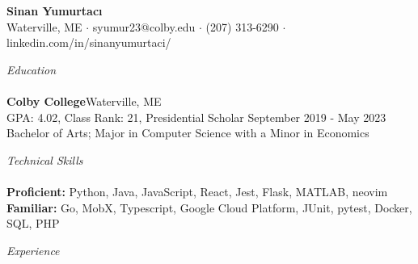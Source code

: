 \documentclass[letterpaper]{article}
\newcommand{\lineunder} {
    \vspace*{-8pt} \\
    \hspace*{-3pt} \hrulefill \\
}
\newcommand{\header} [1] {
	{\hspace*{-3pt}\vspace*{6pt} \textit{#1}}
    \vspace*{-6pt} \lineunder
}
\begin{document}
\vspace*{-40pt}


\vspace*{-10pt}
\begin{center}
	{\Large \textbf {Sinan Yumurtacı}}\\
	Waterville, ME $\cdot$ syumur23@colby.edu $\cdot$ (207) 313-6290 $\cdot$ linkedin.com/in/sinanyumurtaci/\\
\end{center}




\header{Education}
\textbf{Colby College}\hfill Waterville, ME\\
GPA: 4.02, Class Rank: 21, Presidential Scholar \hfill September 2019 - May 2023\\
Bachelor of Arts; Major in Computer Science with a Minor in Economics \\
\vspace{3mm}



\header{Technical Skills}
\vspace{1mm}
\textbf{Proficient:} Python, Java, JavaScript, React, Jest, Flask, MATLAB, neovim\\
\textbf{Familiar:} Go, MobX, Typescript, Google Cloud Platform, JUnit, pytest, Docker, SQL, PHP\\
\vspace{2mm}

\header{Experience}
\vspace{-1mm}
\end{document}
